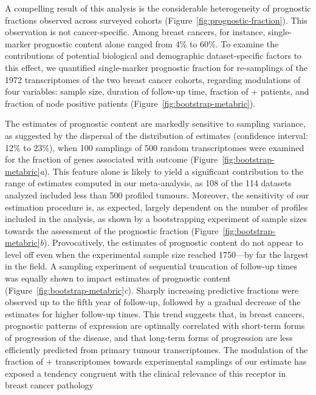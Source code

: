 A compelling result of this analysis is the considerable heterogeneity of
prognostic fractions observed across surveyed cohorts
(Figure~\ref{fig:prognostic-fraction}).  This observation is not
cancer-specific.  Among breast cancers, for instance, single-marker prognostic
content alone ranged from 4\% to 60\%.  To examine the contributions of
potential biological and demographic dataset-specific factors to this effect, we
quantified single-marker prognostic fraction for re-samplings of the \num{1972}
transcriptomes of the two  breast cancer cohorts, regarding
modulations of four variables: sample size, duration of follow-up time, fraction
of + patients, and fraction of node positive patients
(Figure~\ref{fig:bootstrap-metabric}).

The estimates of prognostic content are markedly sensitive to sampling variance,
as suggested by the dispersal of the distribution of estimates (confidence
interval: 12\% to 23\%), when \num{100} samplings of \num{500} random
transcriptomes were examined for the fraction of genes associated with outcome
(Figure~\ref{fig:bootstrap-metabric}\emph{a}).  This feature alone is likely to
yield a significant contribution to the range of estimates computed in our
meta-analysis, as 108 of the 114 datasets analyzed included less than \num{500}
profiled tumours.  Moreover, the sensitivity of our estimation procedure is, as
expected, largely dependent on the number of profiles included in the analysis,
as shown by a bootstrapping experiment of sample sizes towards the assessment of
the prognostic fraction (Figure~\ref{fig:bootstrap-metabric}\emph{b}).
Provocatively, the estimates of prognostic content do not appear to level off
even when the experimental sample size reached \num{1750}---by far the largest
in the field.  A sampling experiment of sequential truncation of follow-up times
was equally shown to impact estimates of prognostic content
(Figure~\ref{fig:bootstrap-metabric}\emph{c}).  Sharply increasing predictive
fractions were observed up to the fifth year of follow-up, followed by a gradual
decrease of the estimates for higher follow-up times.  This trend suggests that,
in breast cancers, prognostic patterns of expression are optimally correlated
with short-term forms of progression of the disease, and that long-term forms of
progression are less efficiently predicted from primary tumour transcriptomes.
The modulation of the fraction of + transcriptomes towards
experimental samplings of our estimate has exposed a tendency congruent with the
clinical relevance of this receptor in breast cancer pathology
